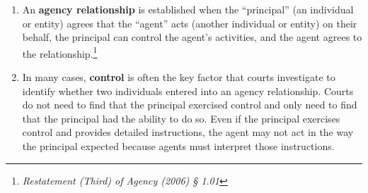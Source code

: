 \documentclass[11pt]{article}
\begin{document}
\begin{enumerate}[wide, labelindent=0pt, itemsep=0pt, topsep=1pt]
    \item[\textbullet] An \textbf{agency relationship} is established when the ``principal'' (an individual or entity) agrees that the ``agent'' acts (another individual or entity) on their behalf, the principal can control the agent's activities, and the agent agrees to the relationship.\footnote{\textit{Restatement (Third) of Agency (2006) § 1.01}}
    \item[\textbullet] In many cases, \textbf{control} is often the key factor that courts investigate to identify whether two individuals entered into an agency relationship.  Courts do not need to find that the principal exercised control and only need to find that the principal had the ability to do so. Even if the principal exercises control and provides detailed instructions, the agent may not act in the way the principal expected because agents must interpret those instructions.
\end{enumerate}
\end{document}
